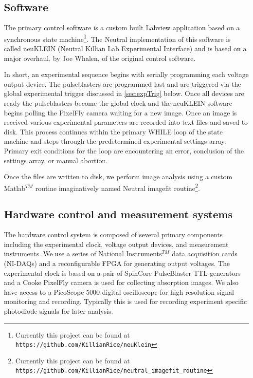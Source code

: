 \subsection{Software} \label{ssec:soft_sys}
The primary control software is a custom built Labview application based on a synchronous state machine\footnote{Currently this project can be found at \texttt{https://github.com/KillianRice/neuKlein}}.
The Neutral implementation of this software is called neuKLEIN (Neutral Killian Lab Experimental Interface) and is based on a major overhaul, by Joe Whalen, of the original control software.

In short, an experimental sequence begins with serially programming each voltage output device.
The pulseblasters are programmed last and are triggered via the global experimental trigger discussed in \ref{sec:expTrig} below.
Once all devices are ready the pulseblasters become the global clock and the neuKLEIN software begins polling the PixelFly camera waiting for a new image.
Once an image is received various experimental parameters are recorded into text files and saved to disk.
This process continues within the primary WHILE loop of the state machine and steps through the predetermined experimental settings array.
Primary exit conditions for the loop are encountering an error, conclusion of the settings array, or manual abortion.

Once the files are written to disk, we perform image analysis using a custom Matlab$^{TM}$ routine imaginatively named Neutral imagefit routine\footnote{Currently this project can be found at \texttt{https://github.com/KillianRice/neutral\_imagefit\_routine}}.

\subsection{Hardware control and measurement systems} \label{ssec:comp_sys}
The hardware control system is composed of several primary components including the experimental clock, voltage output devices, and measurement instruments.
We use a series of National Instruments$^{TM}$ data acquisition cards (NI-DAQs) and a reconfigurable FPGA for generating output voltages.
The experimental clock is based on a pair of SpinCore PulseBlaster TTL generators and a Cooke PixelFly camera is used for collecting absorption images.
We also have access to a PicoScope 5000 digital oscilloscope for high resolution signal monitoring and recording. Typically this is used for recording experiment specific photodiode signals for later analysis.

